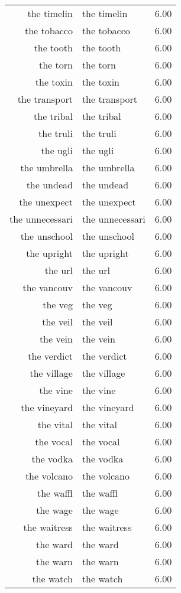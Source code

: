 \begin{table}[ht]
\begin{tabular}{rlr}
  the timelin & the timelin & 6.00 \\ 
  the tobacco & the tobacco & 6.00 \\ 
  the tooth & the tooth & 6.00 \\ 
  the torn & the torn & 6.00 \\ 
  the toxin & the toxin & 6.00 \\ 
  the transport & the transport & 6.00 \\ 
  the tribal & the tribal & 6.00 \\ 
  the truli & the truli & 6.00 \\ 
  the ugli & the ugli & 6.00 \\ 
  the umbrella & the umbrella & 6.00 \\ 
  the undead & the undead & 6.00 \\ 
  the unexpect & the unexpect & 6.00 \\ 
  the unnecessari & the unnecessari & 6.00 \\ 
  the unschool & the unschool & 6.00 \\ 
  the upright & the upright & 6.00 \\ 
  the url & the url & 6.00 \\ 
  the vancouv & the vancouv & 6.00 \\ 
  the veg & the veg & 6.00 \\ 
  the veil & the veil & 6.00 \\ 
  the vein & the vein & 6.00 \\ 
  the verdict & the verdict & 6.00 \\ 
  the village & the village & 6.00 \\ 
  the vine & the vine & 6.00 \\ 
  the vineyard & the vineyard & 6.00 \\ 
  the vital & the vital & 6.00 \\ 
  the vocal & the vocal & 6.00 \\ 
  the vodka & the vodka & 6.00 \\ 
  the volcano & the volcano & 6.00 \\ 
  the waffl & the waffl & 6.00 \\ 
  the wage & the wage & 6.00 \\ 
  the waitress & the waitress & 6.00 \\ 
  the ward & the ward & 6.00 \\ 
  the warn & the warn & 6.00 \\ 
  the watch & the watch & 6.00 \\ 

\end{tabular}
\end{table}
